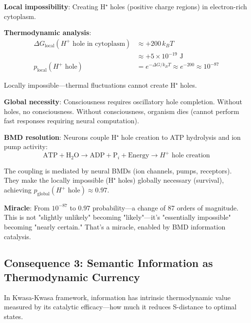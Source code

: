 \begin{example}
\textbf{Local impossibility}: Creating H⁺ holes (positive charge regions) in electron-rich cytoplasm.

\textbf{Thermodynamic analysis}:
\begin{align}
\Delta G_{\text{local}}(H^+ \text{ hole in cytoplasm}) &\approx +200 \, k_B T \\
&\approx +5 \times 10^{-19} \text{ J} \\
p_{\text{local}}(H^+ \text{ hole}) &= e^{-\Delta G/k_B T} \approx e^{-200} \approx 10^{-87}
\end{align}

Locally impossible—thermal fluctuations cannot create H⁺ holes.

\textbf{Global necessity}: Consciousness requires oscillatory hole completion. Without holes, no consciousness. Without consciousness, organism dies (cannot perform fast responses requiring neural computation).

\textbf{BMD resolution}: Neurons couple H⁺ hole creation to ATP hydrolysis and ion pump activity:
\begin{equation}
\text{ATP} + \text{H}_2\text{O} \to \text{ADP} + \text{P}_i + \text{Energy} \to H^+ \text{ hole creation}
\end{equation}

The coupling is mediated by neural BMDs (ion channels, pumps, receptors). They make the locally impossible (H⁺ holes) globally necessary (survival), achieving $p_{\text{global}}(H^+ \text{ hole}) \approx 0.97$.

\textbf{Miracle}: From $10^{-87}$ to $0.97$ probability—a change of 87 orders of magnitude. This is not "slightly unlikely" becoming "likely"—it's "essentially impossible" becoming "nearly certain." That's a miracle, enabled by BMD information catalysis.
\end{example}

\subsection{Consequence 3: Semantic Information as Thermodynamic Currency}

\begin{theorem}
\label{thm:information_as_currency}
In Kwasa-Kwasa framework, information has intrinsic thermodynamic value measured by its catalytic efficacy—how much it reduces S-distance to optimal states.
\end{theorem}

